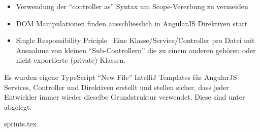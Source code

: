 \begin{itemize}
	\item Verwendung der ``controller as'' Syntax um Scope-Vererbung zu vermeiden
	\item DOM Manipulationen finden ausschliesslich in AngularJS Direktiven statt
	\item Single Responsibility Priciple \textendash\ Eine Klasse/Service/Controller pro Datei mit Ausnahme von kleinen ``Sub-Controllern'' die zu einem anderen gehören oder nicht exportierte (private) Klassen.
\end{itemize}

Es wurden eigene TypeScript ``New File'' IntelliJ Templates für AngularJS Services, Controller und Direktiven erstellt und stellen sicher, dass jeder Entwickler immer wieder dieselbe Grundstruktur verwendet. Diese sind unter  abgelegt.



{sprints.tex}


